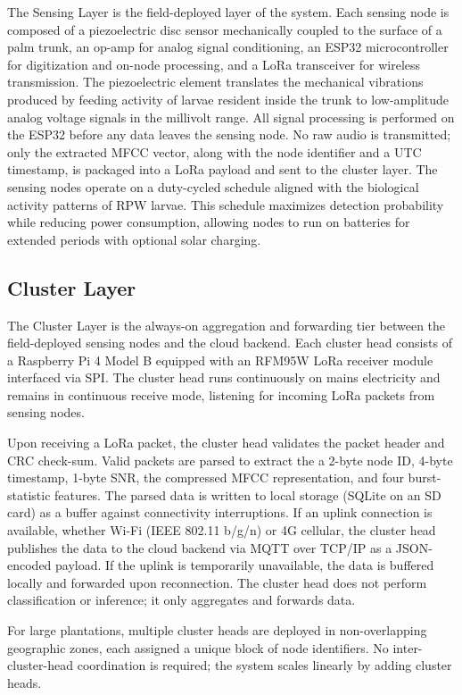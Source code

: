 \documentclass[12pt,a4paper,oneside]{memoir}
\begin{document}
The Sensing Layer is the field-deployed layer of the system. Each sensing node is composed of a piezoelectric disc sensor mechanically coupled to the surface of a palm trunk, an op-amp for analog signal conditioning, an ESP32 microcontroller for digitization and on-node processing, and a LoRa transceiver for wireless transmission. The piezoelectric element translates the mechanical vibrations produced by feeding activity of larvae resident inside the trunk to low-amplitude analog voltage signals in the millivolt range. All signal processing is performed on the ESP32 before any data leaves the sensing node. No raw audio is transmitted; only the extracted MFCC vector, along with the node identifier and a UTC timestamp, is packaged into a LoRa payload and sent to the cluster layer. The sensing nodes operate on a duty-cycled schedule aligned with the biological activity patterns of RPW larvae. This schedule maximizes detection probability while reducing power consumption, allowing nodes to run on batteries for extended periods with optional solar charging.

\subsection{Cluster Layer}

The Cluster Layer is the always-on aggregation and forwarding tier between the field-deployed sensing nodes and the cloud backend. Each cluster head consists of a Raspberry Pi 4 Model B equipped with an RFM95W LoRa receiver module interfaced via SPI. The cluster head runs continuously on mains electricity and remains in continuous receive mode, listening for incoming LoRa packets from sensing nodes.

Upon receiving a LoRa packet, the cluster head validates the packet header and CRC check-sum. Valid packets are parsed to extract the a 2-byte node ID, 4-byte timestamp, 1-byte SNR, the compressed MFCC representation, and four burst-statistic features. The parsed data is written to local storage (SQLite on an SD card) as a buffer against connectivity interruptions. If an uplink connection is available, whether Wi-Fi (IEEE 802.11 b/g/n) or 4G cellular, the cluster head publishes the data to the cloud backend via MQTT over TCP/IP as a JSON-encoded payload. If the uplink is temporarily unavailable, the data is buffered locally and forwarded upon reconnection. The cluster head does not perform classification or inference; it only aggregates and forwards data.

For large plantations, multiple cluster heads are deployed in non-overlapping geographic zones, each assigned a unique block of node identifiers. No inter-cluster-head coordination is required; the system scales linearly by adding cluster heads.
\end{document}
